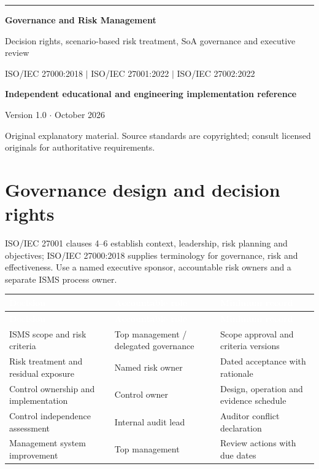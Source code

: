 \documentclass[11pt,letterpaper]{article}
\begin{document}
\begin{titlepage}
\vspace*{1.2in}
{\color{teal}\rule{\textwidth}{4pt}}\par\vspace{20pt}
{\Huge\bfseries\color{navy} Governance and Risk Management}\par\vspace{18pt}
{\Large\color{graytext} Decision rights, scenario-based risk treatment, SoA governance and executive review}\par\vspace{1.3in}
{\large ISO/IEC 27000:2018 $\vert$ ISO/IEC 27001:2022 $\vert$ ISO/IEC 27002:2022}\par
\vfill
\textbf{Independent educational and engineering implementation reference}\par
Version 1.0 $\cdot$ October 2026\par
{\small Original explanatory material. Source standards are copyrighted; consult licensed originals for authoritative requirements.}\par
\end{titlepage}
\tableofcontents\clearpage{}
\section{Governance design and decision rights}
\SourceTag ISO/IEC 27001 clauses 4--6 establish context, leadership, risk planning and objectives; ISO/IEC 27000:2018 supplies terminology for governance, risk and effectiveness. \EngineeringTag Use a named executive sponsor, accountable risk owners and a separate ISMS process owner.
\small{}\begin{longtable}{>{\raggedright\arraybackslash}p{}>{\raggedright\arraybackslash}p{}>{\raggedright\arraybackslash}p{}}
\rowcolor{navy} \textcolor{white}{\textbf{Decision}} & \textcolor{white}{\textbf{Accountable role}} & \textcolor{white}{\textbf{Minimum record}}\\
\endfirsthead
\rowcolor{navy} \textcolor{white}{\textbf{Decision}} & \textcolor{white}{\textbf{Accountable role}} & \textcolor{white}{\textbf{Minimum record}}\\
\endhead
ISMS scope and risk criteria & Top management / delegated governance & Scope approval and criteria versions\\
Risk treatment and residual exposure & Named risk owner & Dated acceptance with rationale\\
Control ownership and implementation & Control owner & Design, operation and evidence schedule\\
Control independence assessment & Internal audit lead & Auditor conflict declaration\\
Management system improvement & Top management & Review actions with due dates\\
\end{longtable}\normalsize
\end{document}
